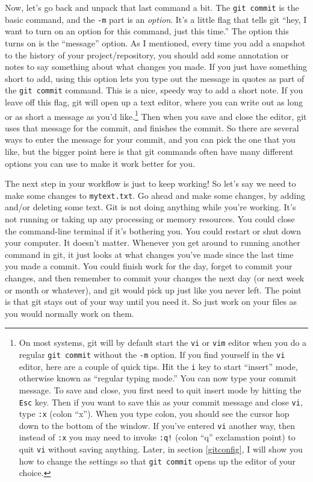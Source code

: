 \documentclass{article}
\begin{document}
Now, let's go back and unpack that last command a bit. The \texttt{git commit} is the basic command, and the \texttt{-m} part is an \emph{option}. It's a little flag that tells git ``hey, I want to turn on an option for this command, just this time.''  The option this turns on is the ``message'' option. As I mentioned, every time you add a snapshot to the history of your project/repository, you should add some annotation or notes to say something about what changes you made. If you just have something short to add, using this option lets you type out the message in quotes as part of the \texttt{git commit} command.  This is a nice, speedy way to add a short note.  If you leave off this flag, git will open up a text editor, where you can write out as long or as short a message as you'd like.\footnote{On most systems, git will by default start the \texttt{vi} or \texttt{vim} editor when you do a regular \texttt{git commit} without the \texttt{-m} option. If you find yourself in the \texttt{vi} editor, here are a couple of quick tips. Hit the \texttt{i} key to start ``insert'' mode, otherwise known as ``regular typing mode.'' You can now type your commit message. To save and close, you first need to quit insert mode by hitting the \texttt{Esc} key. Then if you want to save this as your commit message and close \texttt{vi}, type \texttt{:x} (colon ``x'').  When you type colon, you should see the cursor hop down to the bottom of the window. If you've entered \texttt{vi} another way, then instead of \texttt{:x} you may need to invoke \texttt{:q!} (colon ``q'' exclamation point) to quit \texttt{vi} without saving anything.  Later, in section \ref{gitconfig}, I will show you how to change the settings so that \texttt{git commit} opens up the editor of your choice.
 }  Then when you save and close the editor, git uses that message for the commit, and finishes the commit.  So there are several ways to enter the message for your commit, and you can pick the one that you like, but the bigger point here is that git commands often have many different options you can use to make it work better for you.

The next step in your workflow is just to keep working!  So let's say we need to make some changes to \texttt{mytext.txt}.  Go ahead and make some changes, by adding and/or deleting some text. Git is not doing anything while you're working.  It's not running or taking up any processing or memory resources.  You could close the command-line terminal if it's bothering you.  You could restart or shut down your computer.  It doesn't matter.  Whenever you get around to running another command in git, it just looks at what changes you've made since the last time you made a commit.  You could finish work for the day, forget to commit your changes, and then remember to commit your changes the next day (or next week or month or whatever), and git would pick up just like you never left. The point is that git stays out of your way until you need it. So just work on your files as you would normally work on them.
\end{document}
